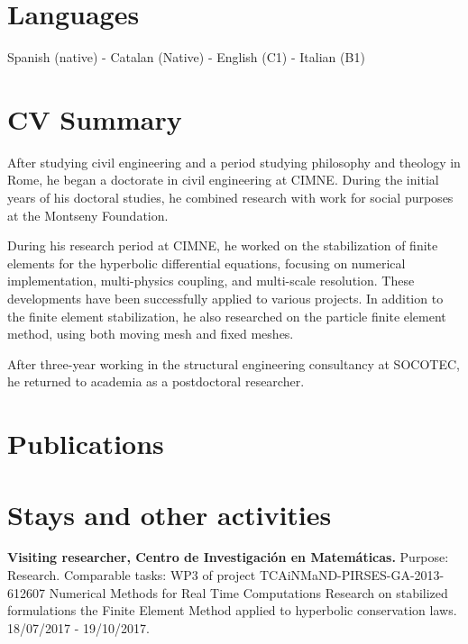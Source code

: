 \documentclass[12pt]{article}
\begin{document}
\section{Languages}
Spanish (native) - Catalan (Native) - English (C1) - Italian (B1)


\section{CV Summary}
After studying civil engineering and a period studying philosophy and theology in Rome, he began
a doctorate in civil engineering at CIMNE. During the initial years of his doctoral studies, he combined
research with work for social purposes at the Montseny Foundation.

During his research period at CIMNE, he worked on the stabilization of finite elements for the hyperbolic
differential equations, focusing on numerical implementation, multi-physics coupling, and multi-scale
resolution. These developments have been successfully applied to various projects. In addition to
the finite element stabilization, he also researched on the particle finite element method, using both
moving mesh and fixed meshes.

After three-year working in the structural engineering consultancy at SOCOTEC, he returned
to academia as a postdoctoral researcher.


\section{Publications}
\nocite{*}
\printbibliography[heading={subbibliography}, title={Journal papers}, type=article]
\printbibliography[heading={subbibliography}, title={Theses}, type=thesis]
\printbibliography[heading={subbibliography}, title={Conferences}, type=inproceedings]


\section{Stays and other activities}
\textbf{Visiting researcher, Centro de Investigación en Matemáticas.} Purpose: Research. Comparable tasks: WP3 of project
TCAiNMaND-PIRSES-GA-2013-612607 Numerical Methods for Real Time Computations Research on stabilized
formulations the Finite Element Method applied to hyperbolic conservation laws. 18/07/2017 - 19/10/2017.
\end{document}
